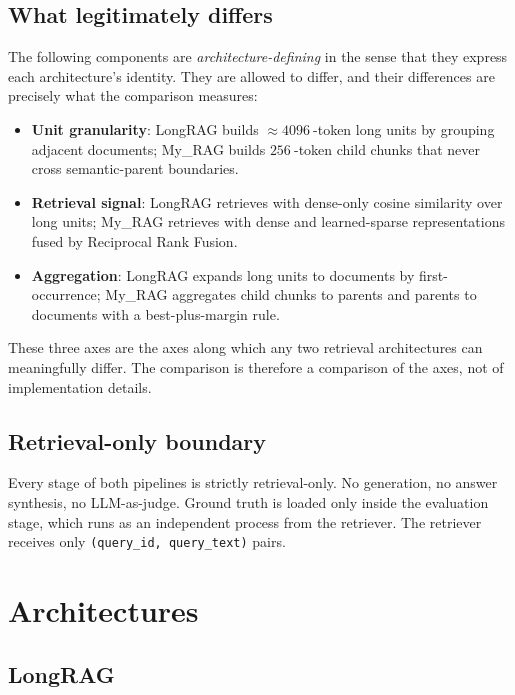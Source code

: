 \documentclass[11pt,a4paper]{article}
\begin{document}
\subsection{What legitimately differs}
The following components are \emph{architecture-defining} in the
sense that they express each architecture's identity. They are
allowed to differ, and their differences are precisely what the
comparison measures:

\begin{itemize}[leftmargin=1.5em,itemsep=0.15em]
  \item \textbf{Unit granularity}: LongRAG builds
    $\approx \SI{4096}{}$-token long units by grouping adjacent
    documents; My\_RAG builds $\SI{256}{}$-token child chunks that
    never cross semantic-parent boundaries.
  \item \textbf{Retrieval signal}: LongRAG retrieves with
    dense-only cosine similarity over long units; My\_RAG retrieves
    with dense and learned-sparse representations fused by
    Reciprocal Rank Fusion.
  \item \textbf{Aggregation}: LongRAG expands long units to
    documents by first-occurrence; My\_RAG aggregates child chunks
    to parents and parents to documents with a best-plus-margin
    rule.
\end{itemize}

These three axes are the axes along which any two retrieval
architectures can meaningfully differ. The comparison is therefore
a comparison of the axes, not of implementation details.

\subsection{Retrieval-only boundary}
Every stage of both pipelines is strictly retrieval-only. No
generation, no answer synthesis, no LLM-as-judge. Ground truth is
loaded only inside the evaluation stage, which runs as an
independent process from the retriever. The retriever receives only
\texttt{(query\_id, query\_text)} pairs.

\section{Architectures}\label{sec:arch}

\subsection{LongRAG}
\end{document}
